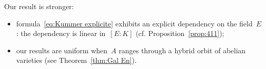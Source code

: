 \documentclass[12pt]{amsart}
\newcommand{\End}{{\rm End}}
\newcommand{\Z}{{\mathbb Z}}
\newcommand{\Q}{{\mathbb Q}}
\newcommand{\ol}{\overline}
\newcommand{\wh}{\widehat}
\newcommand{\tens}{\otimes}
\begin{document}
Our result is stronger:
\begin{itemize}
\item formula~\eqref{eq:Kummer explicite} exhibits an explicit dependency on the field~$E$: the dependency is linear in~$[E:K]$ (cf. Proposition~\ref{prop:411});
\item our results are uniform when~$A$ ranges through a hybrid orbit of abelian varieties (see Theorem~\ref{thm:Gal En}).
\end{itemize}



%
%
%
%
%
%
%
\end{document}
